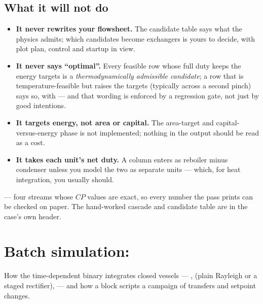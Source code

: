 \documentclass[11pt,a4paper]{article}
\begin{document}
\subsection{What it will not do}

\begin{itemize}
\item \textbf{It never rewrites your flowsheet.}  The candidate table says
      what the physics admits; which candidates become exchangers is
      yours to decide, with plot plan, control and startup in view.
\item \textbf{It never says ``optimal''.}  Every feasible row whose full duty keeps the energy targets is a
      \emph{thermodynamically admissible candidate}; a row that is
      temperature-feasible but raises the targets (typically across a second
      pinch) says so, with  --- and that wording
      is enforced by a regression gate, not just by good intentions.
\item \textbf{It targets energy, not area or capital.}  The area-target
      and capital-versus-energy phase is not implemented; nothing in the
      output should be read as a cost.
\item \textbf{It takes each unit's net duty.}  A column enters as
      reboiler minus condenser unless you model the two as separate
      units --- which, for heat integration, you usually should.
\end{itemize}

\begin{tutoriallink}
 --- four
streams whose $CP$ values are exact, so every number the pass prints can
be checked on paper.  The hand-worked cascade and candidate table are in
the case's own  header.
\end{tutoriallink}

\section{Batch simulation: }\label{sec:batch}

\begin{whatyoulllearn}
How the time-dependent binary integrates closed vessels ---
,  (plain Rayleigh or a staged
rectifier),  --- and how a  block
scripts a campaign of transfers and setpoint changes.
\end{whatyoulllearn}
\end{document}
